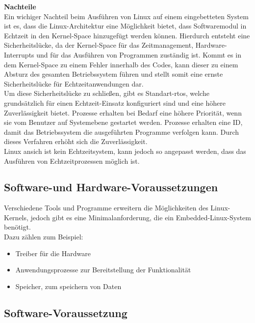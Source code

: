 \textbf{Nachteile}\\
Ein wichiger Nachteil beim Ausführen von Linux auf einem eingebetteten System ist es, dass die Linux-Architektur eine Möglichkeit bietet, dass Softwaremodul in
Echtzeit in den Kernel-Space hinzugefügt werden können. Hierdurch entsteht eine Sicherheitslücke, da der Kernel-Space für das Zeitmanagement, Hardware-Interrupts und
für das Ausführen von Programmen zuständig ist. Kommt es in dem Kernel-Space zu einem Fehler innerhalb des Codes, kann dieser zu einem Absturz des gesamten
Betriebssystem führen und stellt somit eine ernste Sicherheitslücke für Echtzeitanwendungen dar.\\
Um diese Sicherheitslücke zu schließen, gibt es Standart-\ac{rtos}, welche grundsätzlich für einen Echtzeit-Einsatz konfiguriert sind und eine höhere Zuverlässigkeit bietet.
Prozesse erhalten bei Bedarf eine höhere Priorität,
 wenn sie vom Benutzer auf Systemebene gestartet werden. Prozesse erhalten eine ID, damit das Betriebssystem die ausgeführten Programme verfolgen kann.
  Durch dieses Verfahren erhöht sich die Zuverlässigkeit.\cite{ibm}\\
Linux ansich ist kein Echtzeitsystem, kann jedoch so angepasst werden, dass das Ausführen von Echtzeitprozessen möglich ist.\\


\subsection{Software-und Hardware-Voraussetzungen}\label{kap:voraussetzungen}

Verschiedene Tools und Programme erweitern die Möglichkeiten des Linux-Kernels, jedoch gibt es eine Minimalanforderung, die ein Embedded-Linux-System benötigt.\\
Dazu zählen zum Beispiel:\\

\begin{itemize}
  \item Treiber für die Hardware
  \item Anwendungsprozesse zur Bereitstellung der Funktionalität
  \item Speicher, zum speichern von Daten
\end{itemize}


\subsection{Software-Voraussetzung}\label{kap:softwarevoraussetzung}


